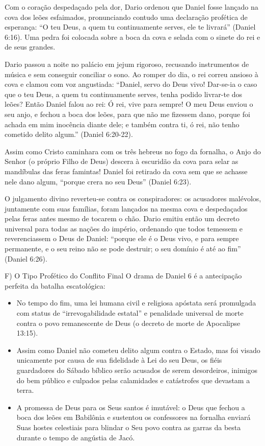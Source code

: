 \documentclass[11pt,a4paper,openany]{book}
\begin{document}
Com o coração despedaçado pela dor, Dario ordenou que Daniel fosse lançado na cova dos leões esfaimados, pronunciando contudo uma declaração profética de esperança: ``O teu Deus, a quem tu continuamente serves, ele te livrará'' (Daniel 6:16). Uma pedra foi colocada sobre a boca da cova e selada com o sinete do rei e de seus grandes.

Dario passou a noite no palácio em jejum rigoroso, recusando instrumentos de música e sem conseguir conciliar o sono. Ao romper do dia, o rei correu ansioso à cova e clamou com voz angustiada:
``Daniel, servo do Deus vivo! Dar-se-ia o caso que o teu Deus, a quem tu continuamente serves, tenha podido livrar-te dos leões? Então Daniel falou ao rei: Ó rei, vive para sempre! O meu Deus enviou o seu anjo, e fechou a boca dos leões, para que não me fizessem dano, porque foi achada em mim inocência diante dele; e também contra ti, ó rei, não tenho cometido delito algum.'' (Daniel 6:20-22).

Assim como Cristo caminhara com os três hebreus no fogo da fornalha, o Anjo do Senhor (o próprio Filho de Deus) descera à escuridão da cova para selar as mandíbulas das feras famintas! Daniel foi retirado da cova sem que se achasse nele dano algum, ``porque crera no seu Deus'' (Daniel 6:23).

O julgamento divino reverteu-se contra os conspiradores: os acusadores malévolos, juntamente com suas famílias, foram lançados na mesma cova e despedaçados pelas feras antes mesmo de tocarem o chão. Dario emitiu então um decreto universal para todas as nações do império, ordenando que todos temessem e reverenciassem o Deus de Daniel: ``porque ele é o Deus vivo, e para sempre permanente, e o seu reino não se pode destruir; o seu domínio é até ao fim'' (Daniel 6:26).

F) O Tipo Profético do Conflito Final
O drama de Daniel 6 é a antecipação perfeita da batalha escatológica:
\begin{itemize}
  \item No tempo do fim, uma lei humana civil e religiosa apóstata será promulgada com status de ``irrevogabilidade estatal'' e penalidade universal de morte contra o povo remanescente de Deus (o decreto de morte de Apocalipse 13:15).
  \item Assim como Daniel não cometeu delito algum contra o Estado, mas foi visado unicamente por causa de sua fidelidade à Lei do seu Deus, os fiéis guardadores do Sábado bíblico serão acusados de serem desordeiros, inimigos do bem público e culpados pelas calamidades e catástrofes que devastam a terra.
  \item A promessa de Deus para os Seus santos é imutável: o Deus que fechou a boca dos leões em Babilônia e sustentou os confessores na fornalha enviará Suas hostes celestiais para blindar o Seu povo contra as garras da besta durante o tempo de angústia de Jacó.
\end{itemize}
\end{document}
